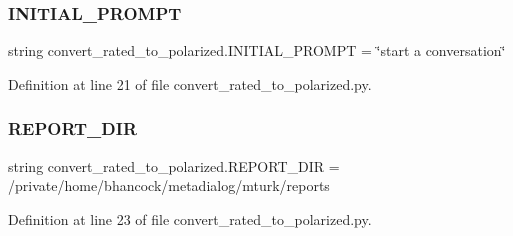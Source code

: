 \subsubsection{\texorpdfstring{I\+N\+I\+T\+I\+A\+L\+\_\+\+P\+R\+O\+M\+PT}{INITIAL\_PROMPT}}
{\footnotesize\ttfamily string convert\+\_\+rated\+\_\+to\+\_\+polarized.\+I\+N\+I\+T\+I\+A\+L\+\_\+\+P\+R\+O\+M\+PT = \char`\"{}start a conversation\char`\"{}}



Definition at line 21 of file convert\+\_\+rated\+\_\+to\+\_\+polarized.\+py.

\mbox{\label{namespaceconvert__rated__to__polarized_a85d5365298d76a5b15db51ed006fa301}} 
\subsubsection{\texorpdfstring{R\+E\+P\+O\+R\+T\+\_\+\+D\+IR}{REPORT\_DIR}}
{\footnotesize\ttfamily string convert\+\_\+rated\+\_\+to\+\_\+polarized.\+R\+E\+P\+O\+R\+T\+\_\+\+D\+IR = \textquotesingle{}/private/home/bhancock/metadialog/mturk/reports\textquotesingle{}}



Definition at line 23 of file convert\+\_\+rated\+\_\+to\+\_\+polarized.\+py.


